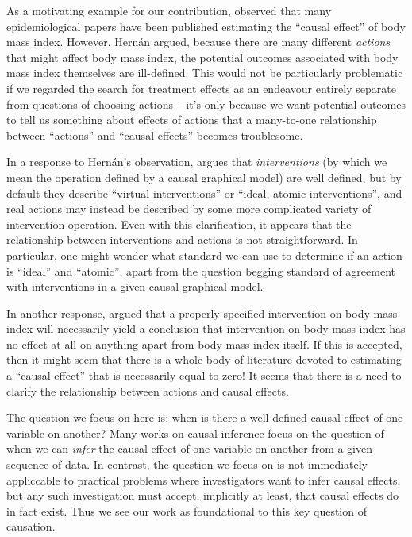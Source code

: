 \documentclass{article}
\theoremstyle{plain}
\theoremstyle{definition}
\begin{document}
As a motivating example for our contribution, \citet{hernan_does_2008} observed that many epidemiological papers have been published estimating the ``causal effect'' of body mass index. However, Hernán argued, because there are many different \emph{actions} that might affect body mass index, the potential outcomes associated with body mass index themselves are ill-defined. This would not be particularly problematic if we regarded the search for treatment effects as an endeavour entirely separate from questions of choosing actions -- it's only because we want potential outcomes to tell us something about effects of actions that a many-to-one relationship between ``actions'' and ``causal effects'' becomes troublesome.

In a response to Hernán's observation, \citet{pearl_does_2018} argues that \emph{interventions} (by which we mean the operation defined by a causal graphical model) are well defined, but by default they describe ``virtual interventions'' or ``ideal, atomic interventions'', and real actions may instead be described by some more complicated variety of intervention operation. Even with this clarification, it appears that the relationship between interventions and actions is not straightforward. In particular, one might wonder what standard we can use to determine if an action is ``ideal'' and ``atomic'', apart from the question begging standard of agreement with interventions in a given causal graphical model.

In another response, \citet{shahar_association_2009} argued that a properly specified intervention on body mass index will necessarily yield a conclusion that intervention on body mass index has no effect at all on anything apart from body mass index itself. If this is accepted, then it might seem that there is a whole body of literature devoted to estimating a ``causal effect'' that is necessarily equal to zero! It seems that there is a need to clarify the relationship between actions and causal effects.

The question we focus on here is: when is there a well-defined causal effect of one variable on another? Many works on causal inference focus on the question of when we can \emph{infer} the causal effect of one variable on another from a given sequence of data. In contrast, the question we focus on is not immediately appliccable to practical problems where investigators want to infer causal effects, but any such investigation must accept, implicitly at least, that causal effects do in fact exist. Thus we see our work as foundational to this key question of causation. 
\end{document}
